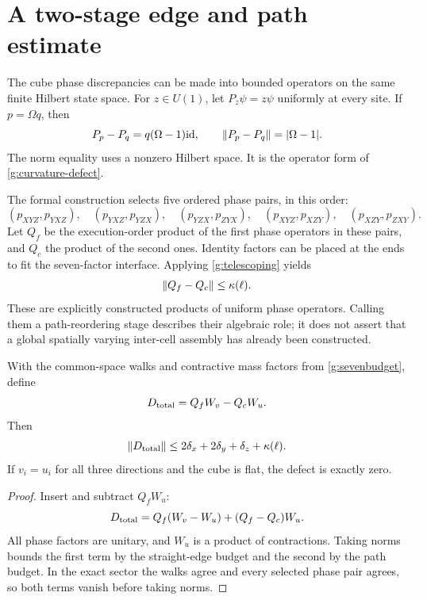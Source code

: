 


\section{A two-stage edge and path estimate}
\label{g:two-stage}
The cube phase discrepancies can be made into bounded operators on the same finite Hilbert state space. For $z\in U(1)$, let $P_z\psi=z\psi$ uniformly at every site. If $p=\Omega q$, then
\[
 P_p-P_q=q(\Omega-1)\mathrm{id},\qquad
 \left\lVert P_p-P_q\right\rVert=|\Omega-1|.
\]
The norm equality uses a nonzero Hilbert space. It is the operator form of \eqref{g:curvature-defect}.

The formal construction selects five ordered phase pairs, in this order:
\[
 (p_{XYZ},p_{YXZ}),\quad(p_{YXZ},p_{YZX}),\quad
 (p_{YZX},p_{ZYX}),\quad(p_{XYZ},p_{XZY}),\quad
 (p_{XZY},p_{ZXY}).
\]
Let $Q_f$ be the execution-order product of the first phase operators in these pairs, and $Q_c$ the product of the second ones. Identity factors can be placed at the ends to fit the seven-factor interface. Applying \eqref{g:telescoping} yields
\[
 \left\lVert Q_f-Q_c\right\rVert\leq\kappa(\ell).
\]
These are explicitly constructed products of uniform phase operators. Calling them a path-reordering stage describes their algebraic role; it does not assert that a global spatially varying inter-cell assembly has already been constructed.

\begin{theorem}
With the common-space walks and contractive mass factors from \eqref{g:sevenbudget}, define
\[
 D_{\rm total}=Q_fW_v-Q_cW_u.
\]
Then
\begin{equation}
 \left\lVert D_{\rm total}\right\rVert
 \leq 2\delta_x+2\delta_y+\delta_z+\kappa(\ell).
 \label{g:combined-budget}
\end{equation}
If $v_i=u_i$ for all three directions and the cube is flat, the defect is exactly zero.
\end{theorem}
\begin{proof}
Insert and subtract $Q_fW_u$:
\[
 D_{\rm total}=Q_f(W_v-W_u)+(Q_f-Q_c)W_u.
\]
All phase factors are unitary, and $W_u$ is a product of contractions. Taking norms bounds the first term by the straight-edge budget and the second by the path budget. In the exact sector the walks agree and every selected phase pair agrees, so both terms vanish before taking norms.
\end{proof}

